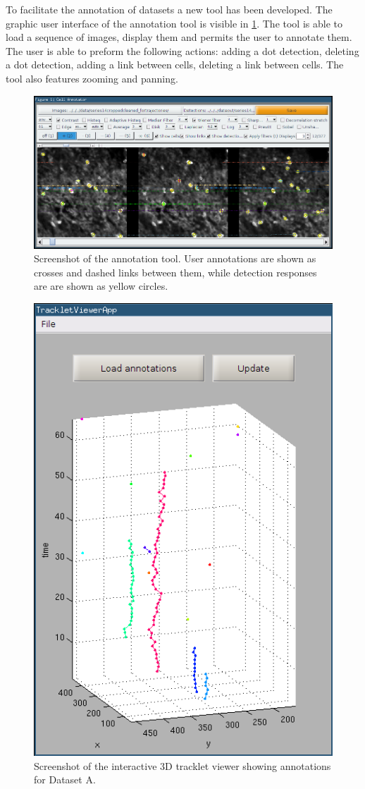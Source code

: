 		To facilitate the annotation of datasets a new tool has been developed. The graphic user interface of the annotation tool is visible in \cref{fig:data_annotator_screenshot}. The tool is able to load a sequence of images, display them and permits the user to annotate them. The user is able to preform the following actions: adding a dot detection, deleting a dot detection, adding a link between cells, deleting a link between cells. The tool also features zooming and panning.
		

		\begin{figure}
			\includegraphics[width=\textwidth]{images/data_annotator_screenshot}
			\caption{Screenshot of the annotation tool. User annotations are shown as crosses and dashed links between them, while detection responses are are shown as yellow circles.}
			\label{fig:data_annotator_screenshot}
		\end{figure}
		
		\begin{figure}
			\centering
			\includegraphics[width=.48\textwidth]{images/data_tracklet_viewer}
			\caption{Screenshot of the interactive 3D tracklet viewer showing annotations for Dataset A.}
			\label{fig:data_tracklet_viewer}
			
		\end{figure}
				
